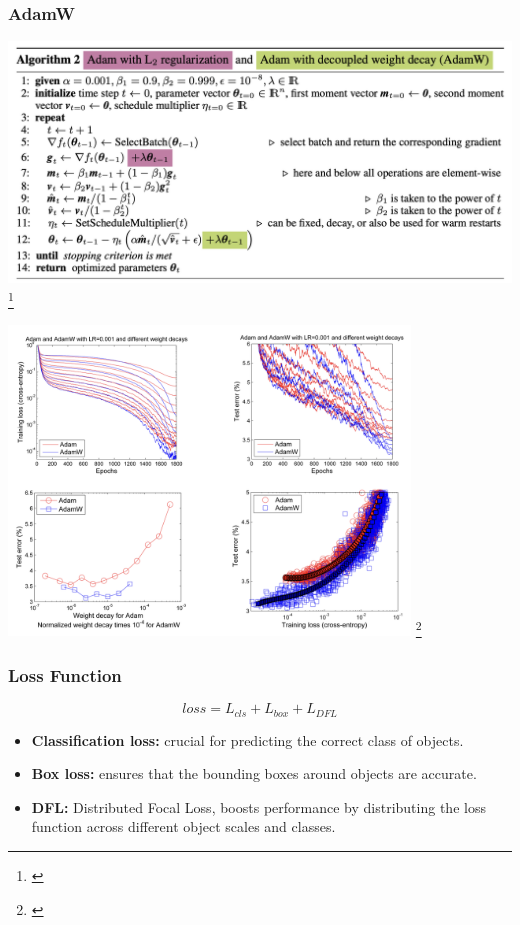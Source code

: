 \documentclass[serif]{beamer}  %
\begin{document}
\begin{frame}
\frametitle{AdamW}
\centering
\includegraphics[width=\textwidth]{images/adamw_algo.png}
\footnote{\cite{loshchilov2019decoupledweightdecayregularization}}
\end{frame}

\begin{frame}
\centering
\includegraphics[width=0.8\textwidth]{images/adamw_com.png}
\footnote{\cite{loshchilov2019decoupledweightdecayregularization}}
\end{frame}

\begin{frame}
\frametitle{Loss Function}
$$
loss = L_{cls} + L_{box} + L_{DFL}
$$
\begin{itemize}
	\item \textbf{Classification loss:} crucial for predicting the correct class of objects.
	\item \textbf{Box loss:} ensures that the bounding boxes around objects are accurate.
	\item \textbf{DFL:} Distributed Focal Loss, boosts performance by distributing the loss function across different object scales and classes.
\end{itemize}
\end{frame}
\end{document}
